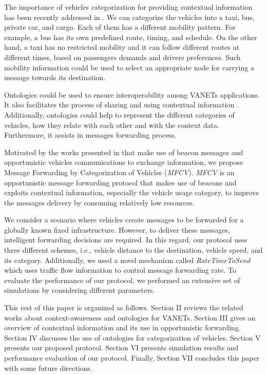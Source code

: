\documentclass[letterpaper, 10 pt, conference]{ieeeconf}  %
\begin{document}
The importance of vehicles categorization for providing contextual information has been recently addressed in \cite{zhang2012, zhang2014}. We can categorize the vehicles into a taxi, bus, private car, and cargo. Each of them has a different mobility pattern. For example, a bus has its own predefined route, timing, and schedule. On the other hand, a taxi has no restricted mobility and it can follow different routes at different times, based on passengers demands and drivers preferences. Such mobility information could be used to select an appropriate node for carrying a message towards its destination.

Ontologies could be used to ensure interoperability among VANETs applications. It also facilitates the process of sharing and using contextual information \cite{madkour2011}. Additionally, ontologies could help to represent the different categories of vehicles, how they relate with each other and with the context data. Furthermore, it assists in messages forwarding process.

Motivated by the works presented in \cite{Yokoyama_2014, ullahadvertising, Ullah2016} that make use of beacon messages and opportunistic vehicles communications to exchange information, we propose Message Forwarding by Categorization of Vehicles (\emph{MFCV}). \emph{MFCV} is an opportunistic message forwarding protocol that makes use of beacons and exploits contextual information, especially the vehicle usage category, to improve the messages delivery by consuming relatively low resources.

We consider a scenario where vehicles create messages to be forwarded for a globally known fixed infrastructure. However, to deliver these messages, intelligent forwarding decisions are required. In this regard, our protocol uses three different schemes, i.e., vehicle distance to the destination, vehicle speed, and its category. Additionally, we used a novel mechanism called \emph{RateTimeToSend} which uses traffic flow information to control message forwarding rate. To evaluate the performance of our protocol, we performed an extensive set of simulations by considering different parameters.

This rest of this paper is organized as follows. Section II reviews the related works about context-awareness and ontologies for VANETs. Section III gives an overview of contextual information and its use in opportunistic forwarding. Section IV discusses the use of ontologies for categorization of vehicles. Section V presents our proposed protocol. Section VI presents simulation results and performance evaluation of our protocol. Finally, Section VII concludes this paper with some future directions.
\end{document}
